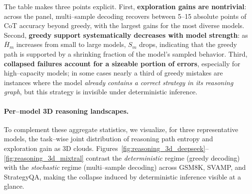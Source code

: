 The table makes three points explicit.
First, \textbf{exploration gains are nontrivial}: across the panel,
multi--sample decoding recovers between 5–15 absolute points of CoT
accuracy beyond greedy, with the largest gains for the most diverse
models.
Second, \textbf{greedy support systematically decreases with model
strength}: as $\overline{H}_m$ increases from small to large models,
$S_m$ drops, indicating that the greedy path is supported by a shrinking
fraction of the model’s sampled behavior.
Third, \textbf{collapsed failures account for a sizeable portion of
errors}, especially for high--capacity models; in some cases nearly a
third of greedy mistakes are instances where the model \emph{already
contains a correct strategy in its reasoning graph}, but this strategy
is invisible under deterministic inference.

\paragraph{Per--model 3D reasoning landscapes.}
To complement these aggregate statistics, we visualize, for three
representative models, the task--wise joint distribution of reasoning
path entropy and exploration gain as 3D clouds.
Figures~\ref{fig:reasoning_3d_deepseek}--\ref{fig:reasoning_3d_mixtral}
contrast the \emph{deterministic} regime (greedy decoding) with the
\emph{stochastic} regime (multi--sample decoding) across
GSM8K, SVAMP, and StrategyQA, making the collapse induced by
deterministic inference visible at a glance.

